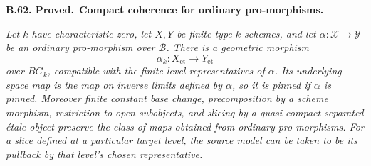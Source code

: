 \documentclass[11pt,a4paper]{article}
\newenvironment{claim}[3]{\par\medskip\noindent\hypertarget{#1}{\textbf{#1. #2.}}\ \textbf{#3.}\par\nopagebreak\smallskip\begingroup\itshape}{\endgroup\par\smallskip}
\begin{document}
\begin{claim}{B.62}{Proved}{Compact coherence for ordinary pro-morphisms}
Let \(k\) have characteristic zero, let \(X,Y\) be finite-type
\(k\)-schemes, and let
\(\alpha:\mathcal X\to\mathcal Y\) be an ordinary pro-morphism
over \(\mathcal B\). There is a geometric morphism
\[
                 \alpha_k:X_{\mathrm{et}}\longrightarrow
                           Y_{\mathrm{et}}                 \tag{B.PRO.1}
\]
over \(BG_k\), compatible with the finite-level representatives of
\(\alpha\). Its underlying-space map is the map on inverse limits
defined by \(\alpha\), so it is pinned if \(\alpha\) is pinned.
Moreover finite constant base change, precomposition by a scheme
morphism, restriction to open subobjects, and slicing by a
quasi-compact separated étale object preserve the class of maps
obtained from ordinary pro-morphisms. For a slice defined at a
particular target level, the source model can be taken to be its
pullback by that level's chosen representative.
\end{claim}
\end{document}
